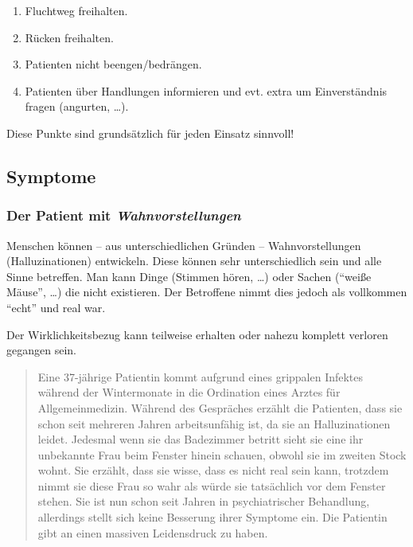 \begin{enumerate}
    \item Fluchtweg freihalten.
    \item Rücken freihalten. 
    \item Patienten nicht beengen/bedrängen.
    \item Patienten über Handlungen informieren und evt.
    extra um Einverständnis fragen (angurten, \ldots).
\end{enumerate}


Diese Punkte sind grundsätzlich für jeden Einsatz sinnvoll!



\subsection{Symptome}

\subsubsection{Der Patient mit \emph{Wahnvorstellungen}}

Menschen können -- aus unterschiedlichen Gründen --
Wahnvorstellungen (Halluzinationen) entwickeln. Diese
können sehr unterschiedlich sein und alle Sinne betreffen.
Man kann Dinge  (Stimmen hören, \ldots)  oder
Sachen  ("`weiße Mäuse"', \ldots) die nicht
existieren. Der Betroffene nimmt dies jedoch als vollkommen
"`echt"' und real war. 

Der Wirklichkeitsbezug kann teilweise erhalten oder nahezu
komplett verloren gegangen sein. 




\begin{quotation}
Eine 37-jährige Patientin kommt aufgrund eines
grippalen Infektes während der Wintermonate in die
Ordination eines Arztes für Allgemeinmedizin. Während des
Gespräches erzählt die Patienten, dass sie schon seit
mehreren Jahren arbeitsunfähig ist, da sie an
Halluzinationen leidet. Jedesmal wenn sie das Badezimmer
betritt sieht sie eine ihr unbekannte Frau beim Fenster
hinein schauen, obwohl sie im zweiten Stock wohnt. Sie
erzählt, dass sie wisse, dass es nicht real sein kann,
trotzdem nimmt sie diese Frau so wahr als würde sie
tatsächlich vor dem Fenster stehen. Sie ist nun schon seit
Jahren in psychiatrischer Behandlung, allerdings stellt
sich keine Besserung ihrer Symptome ein. Die Patientin gibt
an einen massiven Leidensdruck zu haben.
\end{quotation}



